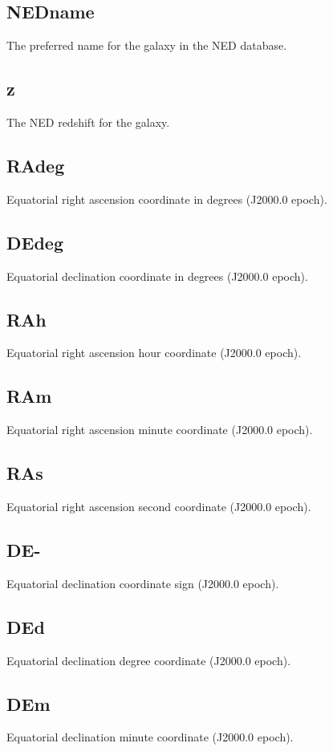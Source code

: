 \documentclass[iop]{emulateapj-rtx4}
\begin{document}
\subsection{NEDname}
The preferred name for the galaxy in the NED database.

\subsection{z}
The NED redshift for the galaxy. 

\subsection{RAdeg}
Equatorial right ascension coordinate in degrees (J2000.0 epoch).

\subsection{DEdeg}
Equatorial declination coordinate in degrees (J2000.0 epoch).

\subsection{RAh}
Equatorial right ascension hour coordinate (J2000.0 epoch).

\subsection{RAm}
Equatorial right ascension minute coordinate (J2000.0 epoch).

\subsection{RAs}
Equatorial right ascension second coordinate (J2000.0 epoch).

\subsection{DE-}
Equatorial declination coordinate sign (J2000.0 epoch).

\subsection{DEd}
Equatorial declination degree coordinate (J2000.0 epoch).

\subsection{DEm}
Equatorial declination minute coordinate (J2000.0 epoch).
\end{document}
